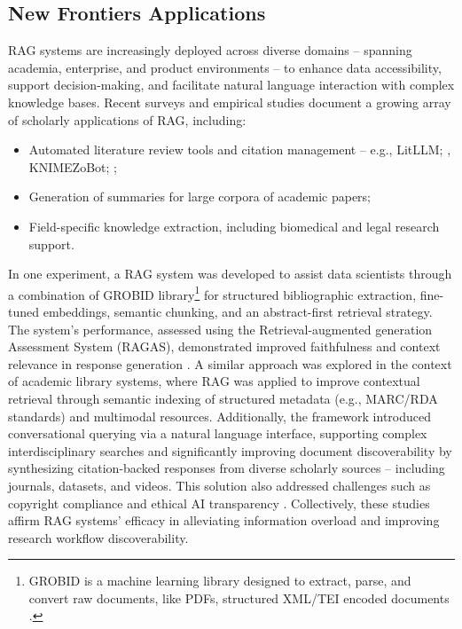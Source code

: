 \begin{spacing}{1.5}
\section{New Frontiers Applications}\label{sec:evol_qas}
RAG systems are increasingly deployed across diverse domains -- spanning academia, enterprise, and product environments -- to enhance data accessibility, support decision-making, and facilitate natural language interaction with complex knowledge bases. Recent surveys and empirical studies document a growing array of scholarly applications of RAG, including:
\begin{itemize}
    \item Automated literature review tools and citation management -- e.g., LitLLM; \citep{agarwal_litllm_2025}, KNIMEZoBot; \citep{alshammari_knimezobot_2023};
    \item Generation of summaries for large corpora of academic papers;
    \item Field-specific knowledge extraction, including biomedical and legal research support.
\end{itemize}

\noindent In one experiment, a RAG system was developed to assist data scientists through a combination of GROBID library\footnote{GROBID is a machine learning library designed to extract, parse, and convert raw documents, like PDFs, structured XML/TEI encoded documents \citep{GROBID}.} for structured bibliographic extraction, fine-tuned embeddings, semantic chunking, and an abstract-first retrieval strategy. The system's performance, assessed using the Retrieval-augmented generation Assessment System (RAGAS), demonstrated improved faithfulness and context relevance in response generation \citep{aytar_retrieval-augmented_2024}. A similar approach was explored in the context of academic library systems, where RAG was applied to improve contextual retrieval through semantic indexing of structured metadata (e.g., MARC/RDA standards) and multimodal resources. Additionally, the framework introduced conversational querying via a natural language interface, supporting complex interdisciplinary searches and significantly improving document discoverability by synthesizing citation-backed responses from diverse scholarly sources -- including journals, datasets, and videos. This solution also addressed challenges such as copyright compliance and ethical AI transparency \citep{bevara_prospects_2025}.  Collectively, these studies affirm RAG systems’ efficacy in alleviating information overload and improving research workflow discoverability.


\end{spacing}
